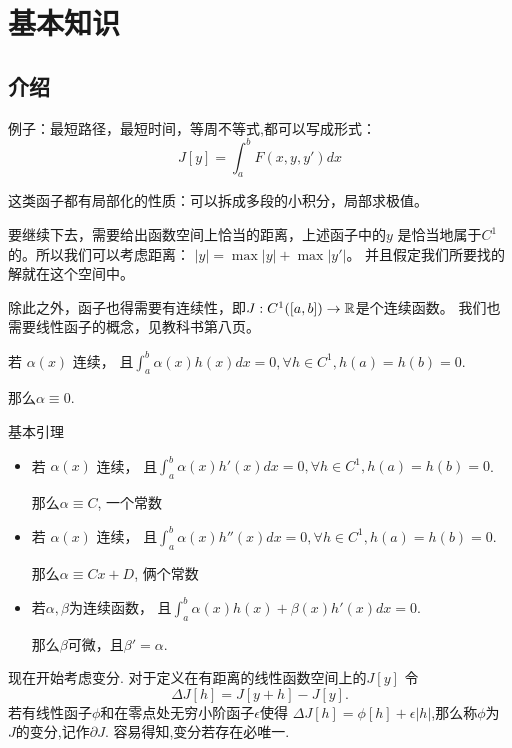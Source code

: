 \section{基本知识}

\subsection{介绍}

例子：最短路径，最短时间，等周不等式,都可以写成形式：
\[J[y] = \int_a^b F(x,y,y')dx\]

这类函子都有局部化的性质：可以拆成多段的小积分，局部求极值。

要继续下去，需要给出函数空间上恰当的距离，上述函子中的\(y\)
是恰当地属于\(C^1\)的。所以我们可以考虑距离：
\(|y| =\max|y| + \max|y'|\)。
并且假定我们所要找的解就在这个空间中。

除此之外，函子也得需要有连续性，即\(J:C^1([a,b])\to \mathbb{R}\)是个连续函数。
我们也需要线性函子的概念，见教科书第八页。

\begin{lem}
    若 \(\alpha(x)\) 连续，
    且\(\int_a^b\alpha(x)h(x)dx=0,\forall h\in C^1, h(a)=h(b)=0\).

    那么\(\alpha  \equiv 0\).
\end{lem}

\begin{lem}基本引理

\begin{itemize}
\item 若 \(\alpha(x)\) 连续，
    且\(\int_a^b\alpha(x)h'(x)dx=0,\forall h\in C^1, h(a)=h(b)=0\).

    那么\(\alpha  \equiv C\), 一个常数

\item 若 \(\alpha(x)\) 连续，
    且\(\int_a^b\alpha(x)h''(x)dx=0,\forall h\in C^1, h(a)=h(b)=0\).

    那么\(\alpha  \equiv Cx + D\), 俩个常数

\item 若\(\alpha,\beta\)为连续函数，
    且\(\int_a^b \alpha(x)h(x)+\beta(x)h'(x)dx = 0\).

    那么\(\beta\)可微，且\(\beta' = \alpha\).

\end{itemize}
\end{lem}


现在开始考虑变分. 对于定义在有距离的线性函数空间上的\(J[y]\)
令
\[\Delta J[h] = J[y+h]-J[y].\]
若有线性函子\(\phi\)和在零点处无穷小阶函子\(\epsilon\)使得
\(\Delta J[h] = \phi[h] + \epsilon|h|\),那么称\(\phi\)为
\(J\)的变分,记作\(\partial J\).
容易得知,变分若存在必唯一.

